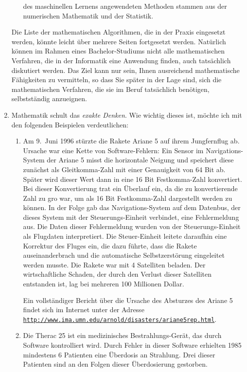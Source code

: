 \begin{enumerate}
\begin{enumerate}
            des maschinellen Lernens angewendeten Methoden stammen aus der numerischen Mathematik
            und der Statistik.
      \end{enumerate}
      Die Liste der mathematischen Algorithmen, die in der Praxis eingesetzt werden, k\"{o}nnte leicht
      \"{u}ber mehrere Seiten fortgesetzt werden.  Nat\"{u}rlich k\"{o}nnen im Rahmen eines Bachelor-Studiums
      nicht alle mathematischen Verfahren, die in der Informatik eine Anwendung finden, auch
      tats\"{a}chlich diskutiert werden.  Das Ziel kann nur sein, Ihnen ausreichend mathematische
      F\"{a}higkeiten zu vermitteln, so dass Sie sp\"{a}ter in der Lage sind, sich die
      mathematischen Verfahren, die sie  im Beruf tats\"{a}chlich ben\"{o}tigen, selbstst\"{a}ndig anzueignen.
\item Mathematik schult das \emph{exakte Denken}.  Wie wichtig dieses ist, m\"{o}chte ich mit den
      folgenden Beispielen verdeutlichen:  
      \begin{enumerate}
      \item Am 9.~Juni 1996 st\"{u}rzte die Rakete Ariane 5 auf ihrem Jungfernflug ab.
            Ursache war eine Kette von Software-Fehlern:  Ein Sensor im Navigations-System
            der Ariane 5 misst die horizontale Neigung und speichert diese zun\"{a}chst als Gleitkomma-Zahl
            mit einer Genauigkeit von 64 Bit ab.  Sp\"{a}ter wird dieser Wert dann in eine 
            16 Bit Festkomma-Zahl konvertiert.
            Bei dieser Konvertierung trat ein \"{U}berlauf ein, da die zu konvertierende Zahl
            zu gro\3 war, um als 16 Bit Festkomma-Zahl dargestellt werden zu k\"{o}nnen.
            In der Folge gab das Navigations-System auf dem Datenbus, der dieses System mit
            der Steuerungs-Einheit verbindet, eine Fehlermeldung aus.
            Die Daten dieser Fehlermeldung wurden von der Steuerungs-Einheit als Flugdaten 
            interpretiert.  Die Steuer-Einheit leitete daraufhin eine Korrektur des
            Fluges ein, die dazu f\"{u}hrte, dass die Rakete auseinanderbrach und die 
            automatische Selbstzerst\"{o}rung eingeleitet werden musste.
            Die Rakete war mit 4 Satelliten beladen. Der wirtschaftliche Schaden, der durch den Verlust dieser
            Satelliten entstanden ist, lag bei mehreren 100 Millionen Dollar.
            
            Ein vollst\"{a}ndiger Bericht \"{u}ber die Ursache des Absturzes des Ariane 5 findet sich
            im Internet unter der Adresse \\[0.2cm]
            \hspace*{0.5cm} 
            \href{http://www.ima.umn.edu/~arnold/disasters/ariane5rep.html}{\texttt{http://www.ima.umn.edu/arnold/disasters/ariane5rep.html}}.
      \item Die Therac 25 ist ein medizinisches Bestrahlungs-Ger\"{a}t, das durch 
            Software kontrolliert wird.  Durch  Fehler in dieser Software erhielten 1985
            mindestens 6 Patienten eine \"{U}berdosis an Strahlung.  Drei dieser Patienten sind an den
            Folgen dieser \"{U}berdosierung gestorben. 


\end{enumerate}
\end{enumerate}
